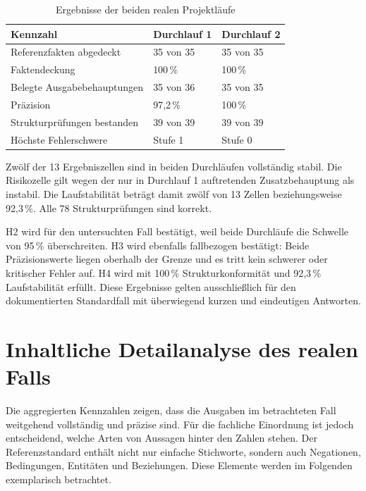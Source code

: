 \documentclass[
  10pt,
  ngerman,
  a4paper,
  toc=graduated,
  numbers=noenddot,
  headings=standardclasses,
  nonumberlist
]{scrartcl}
\newcommand{\pct}[1]{#1\,\%}
\begin{document}
\begin{table}[H]
\centering
\small
\begin{tabularx}{\textwidth}{Y C{2.2cm}C{2.2cm}}
\toprule
{}
\textbf{Kennzahl} & \textbf{Durchlauf 1} & \textbf{Durchlauf 2}\\
\midrule
Referenzfakten abgedeckt & 35 von 35 & 35 von 35\\
Faktendeckung & \pct{100} & \pct{100}\\
Belegte Ausgabebehauptungen & 35 von 36 & 35 von 35\\
Präzision & \pct{97{,}2} & \pct{100}\\
Strukturprüfungen bestanden & 39 von 39 & 39 von 39\\
Höchste Fehlerschwere & Stufe 1 & Stufe 0\\
\bottomrule
\end{tabularx}
\caption{Ergebnisse der beiden realen Projektläufe}
\label{tab:reale_ergebnisse}
\end{table}

Zwölf der 13 Ergebniszellen sind in beiden Durchläufen vollständig stabil. Die Risikozelle gilt wegen der nur in Durchlauf 1 auftretenden Zusatzbehauptung als instabil. Die Laufstabilität beträgt damit zwölf von 13 Zellen beziehungsweise \pct{92{,}3}. Alle 78 Strukturprüfungen sind korrekt.

H2 wird für den untersuchten Fall bestätigt, weil beide Durchläufe die Schwelle von \pct{95} überschreiten. H3 wird ebenfalls fallbezogen bestätigt: Beide Präzisionswerte liegen oberhalb der Grenze und es tritt kein schwerer oder kritischer Fehler auf. H4 wird mit \pct{100} Strukturkonformität und \pct{92{,}3} Laufstabilität erfüllt. Diese Ergebnisse gelten ausschließlich für den dokumentierten Standardfall mit überwiegend kurzen und eindeutigen Antworten.

\section{Inhaltliche Detailanalyse des realen Falls}

Die aggregierten Kennzahlen zeigen, dass die Ausgaben im betrachteten Fall weitgehend vollständig und präzise sind. Für die fachliche Einordnung ist jedoch entscheidend, welche Arten von Aussagen hinter den Zahlen stehen. Der Referenzstandard enthält nicht nur einfache Stichworte, sondern auch Negationen, Bedingungen, Entitäten und Beziehungen. Diese Elemente werden im Folgenden exemplarisch betrachtet.
\end{document}
